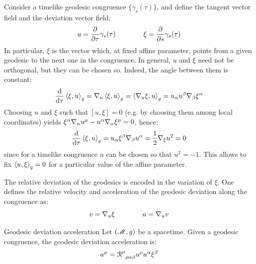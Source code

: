 Consider a timelike geodesic congruence $ \{\gamma_s(\tau)\} $, and define the tangent vector field and the deviation vector field:
\begin{equation}
  u = \frac{\partial}{\partial \tau} \gamma_s(\tau)
  \qquad \qquad
  \xi = \frac{\partial}{\partial s} \gamma_s(\tau)
\end{equation}
In particular, $ \xi $ is the vector which, at fixed affine parameter, points from a given geodesic to the next one in the congruence. In general, $ u $ and $ \xi $ need not be orthogonal, but they can be chosen so. Indeed, the angle between them is constant:
\begin{equation*}
  \frac{\mathrm{d}}{\mathrm{d} \tau} \braket{\xi , u}_g = \nabla_u \braket{\xi , u}_g = \braket{\nabla_u \xi , u}_g = u_\alpha u^\beta \nabla_\beta \xi^\alpha
\end{equation*}
Choosing $ u $ and $ \xi $ such that $ [u , \xi] = 0 $ (e.g. by choosing them among local coordinates) yields $ \xi^\alpha \nabla_\alpha u^\mu - u^\alpha \nabla_\alpha \xi^\mu = 0 $, hence:
\begin{equation*}
  \frac{\mathrm{d}}{\mathrm{d} \tau} \braket{\xi , u}_g = u_\alpha \xi^\beta \nabla_\beta u^\alpha = \frac{1}{2} \nabla_\xi u^2 = 0
\end{equation*}
since for a timelike congruence $ u $ can be chosen so that $ u^2 = -1 $. This allows to fix $ \braket{u , \xi}_g = 0 $ for a particular value of the affine parameter.

The relative deviation of the geodesics is encoded in the variation of $ \xi $. One defines the relative velocity and acceleration of the geodesic deviation along the congruence as:
\begin{equation*}
  v = \nabla_u \xi
  \qquad \qquad
  a = \nabla_u v
\end{equation*}

\begin{lemma}{Geodesic deviation acceleration}{}
  Let $ (\mathscr{M},g) $ be a spacetime. Given a geodesic congruence, the geodesic deviation acceleration is:
  \begin{equation}
    a^\mu = \tensor{\rr}{^\mu_{\rho \alpha \beta}} u^\rho u^\alpha \xi^\beta
    \label{eq:geodesic-acceleration}
  \end{equation}
\end{lemma}

